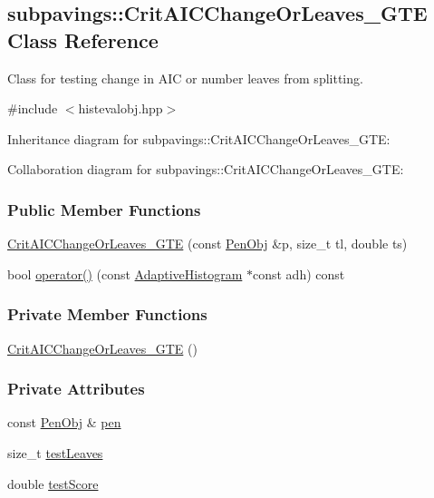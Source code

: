 \hypertarget{classsubpavings_1_1CritAICChangeOrLeaves__GTE}{\subsection{subpavings\-:\-:\-Crit\-A\-I\-C\-Change\-Or\-Leaves\-\_\-\-G\-T\-E \-Class \-Reference}
\label{classsubpavings_1_1CritAICChangeOrLeaves__GTE}
}


\-Class for testing change in \-A\-I\-C or number leaves from splitting.  




{\ttfamily \#include $<$histevalobj.\-hpp$>$}



\-Inheritance diagram for subpavings\-:\-:\-Crit\-A\-I\-C\-Change\-Or\-Leaves\-\_\-\-G\-T\-E\-:


\-Collaboration diagram for subpavings\-:\-:\-Crit\-A\-I\-C\-Change\-Or\-Leaves\-\_\-\-G\-T\-E\-:
\subsubsection*{\-Public \-Member \-Functions}
\begin{DoxyCompactItemize}
\item 
\hyperlink{classsubpavings_1_1CritAICChangeOrLeaves__GTE_a87f9fb396831944c31f7b89e04aabc69}{\-Crit\-A\-I\-C\-Change\-Or\-Leaves\-\_\-\-G\-T\-E} (const \hyperlink{classsubpavings_1_1PenObj}{\-Pen\-Obj} \&p, size\-\_\-t tl, double ts)
\item 
bool \hyperlink{classsubpavings_1_1CritAICChangeOrLeaves__GTE_ad41d362796c0f10185375bb5a3ce5d0b}{operator()} (const \hyperlink{classsubpavings_1_1AdaptiveHistogram}{\-Adaptive\-Histogram} $\ast$const adh) const 
\end{DoxyCompactItemize}
\subsubsection*{\-Private \-Member \-Functions}
\begin{DoxyCompactItemize}
\item 
\hyperlink{classsubpavings_1_1CritAICChangeOrLeaves__GTE_a799c8c75625120ce151f39791a18f420}{\-Crit\-A\-I\-C\-Change\-Or\-Leaves\-\_\-\-G\-T\-E} ()
\end{DoxyCompactItemize}
\subsubsection*{\-Private \-Attributes}
\begin{DoxyCompactItemize}
\item 
const \hyperlink{classsubpavings_1_1PenObj}{\-Pen\-Obj} \& \hyperlink{classsubpavings_1_1CritAICChangeOrLeaves__GTE_a920999ec1b5f624dec19bf8a504a8253}{pen}
\item 
size\-\_\-t \hyperlink{classsubpavings_1_1CritAICChangeOrLeaves__GTE_ad8960d95c624326914fb57574c3ecd6d}{test\-Leaves}
\item 
double \hyperlink{classsubpavings_1_1CritAICChangeOrLeaves__GTE_a9ee854413b520e9da587f5a37a0fab6b}{test\-Score}
\end{DoxyCompactItemize}


